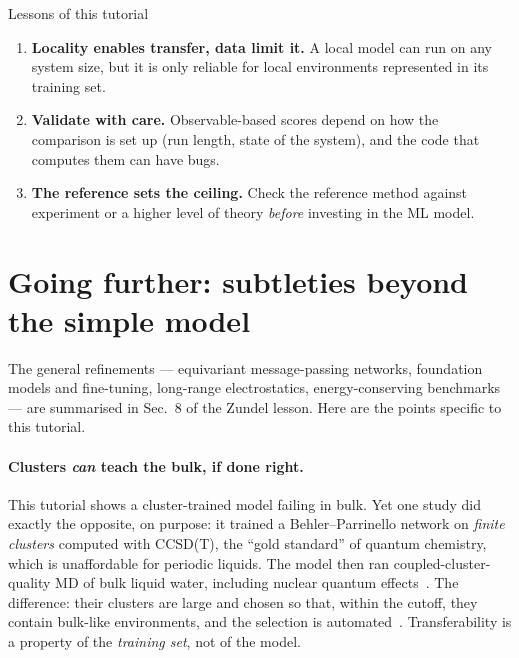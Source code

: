 \documentclass[11pt,a4paper]{article}
\begin{document}
\begin{keybox}{Lessons of this tutorial}
\begin{enumerate}[nosep,leftmargin=*]
  \item \textbf{Locality enables transfer, data limit it.} A local model can
        run on any system size, but it is only reliable for local environments
        represented in its training set.
  \item \textbf{Validate with care.} Observable-based scores depend on how the
        comparison is set up (run length, state of the system), and the code
        that computes them can have bugs.
  \item \textbf{The reference sets the ceiling.} Check the reference method
        against experiment or a higher level of theory \emph{before} investing
        in the ML model.
\end{enumerate}
\end{keybox}

\section{Going further: subtleties beyond the simple model}
\label{sec:novelty}

The general refinements --- equivariant message-passing networks, foundation
models and fine-tuning, long-range electrostatics, energy-conserving
benchmarks --- are summarised in Sec.~8 of the Zundel lesson. Here are the
points specific to this tutorial.

\paragraph{Clusters \emph{can} teach the bulk, if done right.} This tutorial
shows a cluster-trained model failing in bulk. Yet one study did exactly
the opposite, on purpose: it trained a Behler--Parrinello network on
\emph{finite clusters} computed with CCSD(T), the ``gold standard'' of quantum
chemistry, which is unaffordable for periodic liquids. The model then ran
coupled-cluster-quality MD of bulk liquid water, including nuclear quantum
effects~\cite{Daru2022}. The difference: their clusters are large and chosen
so that, within the cutoff, they contain bulk-like environments, and the
selection is automated~\cite{Schran2020cc}. Transferability is a property of
the \emph{training set}, not of the model.
\end{document}
